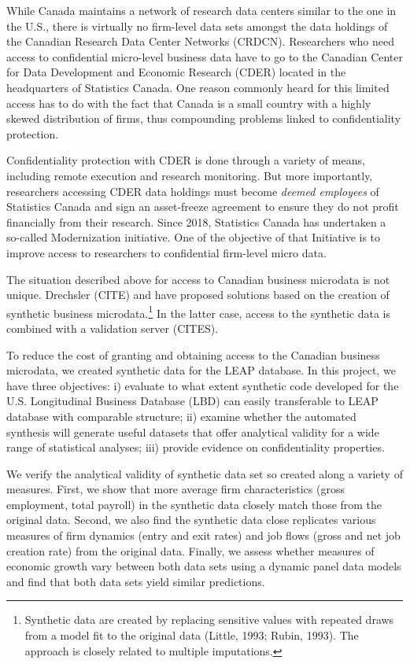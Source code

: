 While Canada maintains a network of research data centers similar to the one in the U.S., there is virtually no firm-level data sets amongst the data holdings of the Canadian Research Data Center Networks (CRDCN). Researchers who need access to confidential micro-level business data have to go to the Canadian Center for Data Development and Economic Research (CDER) located in the headquarters of Statistics Canada. One reason commonly heard for this limited access has to do with the fact that Canada is a small country with a highly skewed distribution of firms, thus compounding problems linked to confidentiality protection. 

Confidentiality protection with CDER is done through a variety of means, including remote execution and research monitoring. But more importantly, researchers accessing CDER data holdings must become \textit{deemed employees} of Statistics Canada and sign an asset-freeze agreement to ensure they do not profit financially from their research. Since 2018, Statistics Canada has undertaken a so-called Modernization initiative. One of the objective of that Initiative is to improve access to researchers to confidential firm-level micro data.

The situation described above for access to Canadian business microdata is not unique. Drechsler (CITE) and \cite{RePEc:bla:istatr:v:79:y:2011:i:3:p:362-384} have proposed solutions based on the creation of synthetic business microdata.\footnote{Synthetic data are created by replacing sensitive values with repeated draws from a model fit to the original data (Little, 1993; Rubin, 1993). The approach is closely related to multiple imputations.} In the latter case, access to the synthetic data is combined with a validation server (CITES). 

To reduce the cost of granting and obtaining access to the Canadian business microdata, we created  synthetic data for the  \ac{LEAP} database. In this project, we have three objectives: i) evaluate to what extent synthetic code developed for the U.S. Longitudinal Business Database (LBD) can easily transferable to LEAP database with comparable structure; ii) examine whether the automated synthesis will generate useful datasets that offer analytical validity for a wide range of statistical analyses; iii) provide evidence on confidentiality properties. 


We verify the analytical validity of synthetic data set so created along a variety of measures. First, we show that more average firm characteristics (gross employment, total payroll) in the synthetic data closely match those from the original data. Second, we also find the synthetic data close replicates various measures of firm dynamics (entry and exit rates) and job flows (gross and net job creation rate) from the original data. Finally, we assess whether measures of economic growth vary between both data sets using a dynamic panel data models and find that both data sets yield similar predictions.


